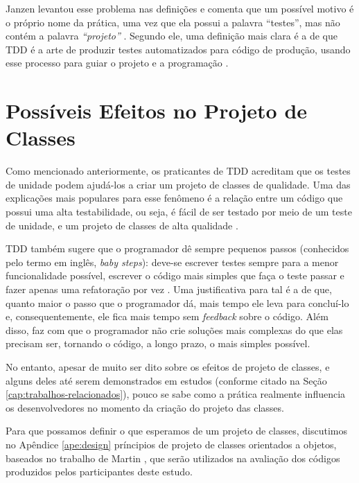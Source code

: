 Janzen levantou esse problema nas definições e comenta que um possível 
motivo é o próprio nome da prática, uma vez
que ela possui a palavra ``testes'', mas não contém a palavra \textit{``projeto''} 
\cite{tdd-really-improve}.
Segundo ele, uma definição mais clara é a de que TDD é a arte de produzir testes
automatizados para código de produção, usando esse processo para guiar o 
projeto e a programação \cite{agilealliance-tdd} \cite{tdd-taxonomy}.

\section{Possíveis Efeitos no Projeto de Classes}

Como mencionado anteriormente, os praticantes de TDD acreditam que os testes de unidade
podem ajudá-los a criar um projeto de classes de qualidade. Uma das explicações mais
populares para esse fenômeno é a relação
entre um código que possui uma alta testabilidade, ou seja, é fácil de ser testado
por meio de um teste de unidade, e um projeto de classes de alta qualidade \cite{feathers-synergy}.

TDD também sugere que o programador dê sempre pequenos passos (conhecidos pelo termo em
inglês, \textit{baby steps}): deve-se escrever testes sempre para a menor
funcionalidade possível, escrever o código mais simples que faça o teste passar
e fazer apenas uma refatoração por vez \cite{TDDByExample}.
Uma justificativa para tal é a de que, quanto maior o passo que o programador dá, mais
tempo ele leva para concluí-lo e, consequentemente, ele fica mais tempo
sem \textit{feedback} sobre o código. Além disso, faz com que o programador não crie
soluções mais complexas do que elas precisam ser, tornando o código, a longo
prazo, o mais simples possível.

No entanto, apesar de muito ser dito sobre os efeitos de projeto de classes, e alguns deles
até serem demonstrados em estudos (conforme citado na Seção \ref{cap:trabalhos-relacionados}), 
pouco se sabe como a prática realmente influencia os desenvolvedores no momento da criação do
projeto das classes.

Para que possamos definir o que esperamos de um projeto de classes,
discutimos no Apêndice \ref{ape:design}
príncipios de projeto de classes orientados a objetos, baseados no trabalho de
Martin \cite{bob-martin}, que serão utilizados na avaliação dos códigos
produzidos pelos participantes deste estudo.

